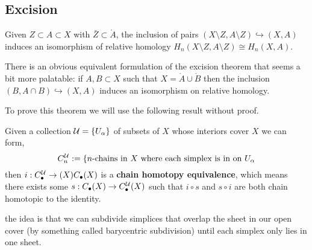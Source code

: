 \documentclass[a4paper]{article}
\begin{document}

\subsection{Excision}

\begin{thrm}[Excision]
    Given $Z\subset A \subset X$ with $\bar{Z}\subset \mathring{A}$, the inclusion of pairs $(X\setminus Z,A\setminus Z)\hookrightarrow (X,A)$ induces an isomorphism of relative homology $H_n(X\setminus Z,A\setminus Z)\cong H_n(X,A)$.
\end{thrm}
There is an obvious equivalent formulation of the excision theorem that seems a bit more palatable: if $A,B\subset X$ such that $X=\mathring{A}\cup\mathring{B}$ then the inclusion $(B,A\cap B)\hookrightarrow (X,A)$ induces an isomorphism on relative homology.

To prove this theorem we will use the following result without proof.
\begin{prop}
    Given a collection $\mathcal{U}=\{U_\alpha\}$ of subsets of $X$ whose interiors cover $X$ we can form,\[
        C_n^{\mathcal{U}}:=\{\text{$n$-chains in  $X$ where each simplex is in on $U_\alpha$}
    \] then $i:C_\bullet^{\mathcal{U}}\rightarrow(X) C_\bullet(X)$ is a \textbf{chain homotopy equivalence}, which means there exists some $s:C_\bullet(X)\rightarrow C_\bullet^{\mathcal{U}}(X)$ such that $i\circ s$ and $s\circ i$ are both chain homotopic to the identity.
\end{prop}
the idea is that we can subdivide simplices that overlap the sheet in our open cover (by something called barycentric subdivision) until each simplex only lies in one sheet.
\end{document}
